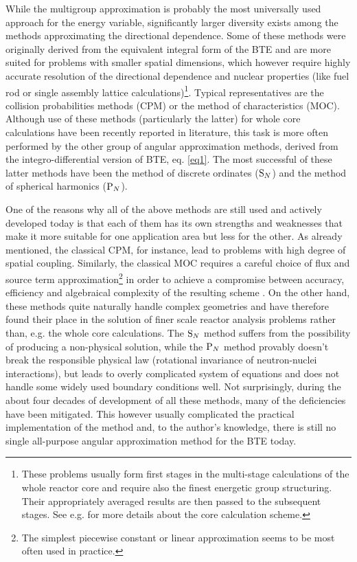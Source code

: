 While the multigroup approximation is probably the most universally used approach for the energy variable, significantly larger diversity exists among the methods approximating the directional dependence. Some of these methods were originally derived from the equivalent integral form of the BTE and are more suited for problems with smaller spatial dimensions, which however require highly accurate resolution of the directional dependence and nuclear properties (like fuel rod or single assembly lattice calculations)\footnote{These problems usually form first stages in the multi-stage calculations of the whole reactor core and require also the finest energetic group structuring. Their appropriately averaged results are then passed to the subsequent stages. See e.g. \cite[Chap. 17]{Reuss1} for more details about the core calculation scheme.}. Typical representatives are the collision probabilities methods (CPM) or the method of characteristics (MOC). Although use of these methods (particularly the latter) for whole core calculations have been recently reported in literature, this task is more often performed by the other group of angular approximation methods, derived from the integro-differential version of BTE, eq. \eqref{eq1}. The most successful of these latter methods have been the method of discrete ordinates ($\mathrm{S}_{N}$) and the method of spherical harmonics ($\mathrm{P}_{N}$). 

One of the reasons why all of the above methods are still used and actively developed today is that each of them has its own strengths and weaknesses that make it more suitable for one application area but less for the other. As already mentioned, the classical CPM, for instance, lead to problems with high degree of spatial coupling. Similarly, the classical MOC requires a careful choice of flux and source term approximation\footnote{The simplest piecewise constant\cite{Kosaka1,Kosaka2,Cho2,Wu1,Hursin1} or linear approximation \cite{Petkov1,Sanchez1} seems to be most often used in practice.} in order to achieve a compromise between accuracy, efficiency and algebraical complexity of the resulting scheme \cite{Yamamoto1}. On the other hand, these methods quite naturally handle complex geometries and have therefore found their place in the solution of finer scale reactor analysis problems rather than, e.g. the whole core calculations. The $\mathrm{S}_{N}$ method suffers from the possibility of producing a non-physical solution, while the $\mathrm{P}_{N}$ method provably doesn't break the responsible physical law (rotational invariance of neutron-nuclei interactions), but leads to overly complicated system of equations and does not handle some widely used boundary conditions well. Not surprisingly, during the about four decades of development of all these methods, many of the deficiencies have been mitigated. This however usually complicated the practical implementation of the method and, to the author's knowledge, there is still no single all-purpose angular approximation method for the BTE today. 

